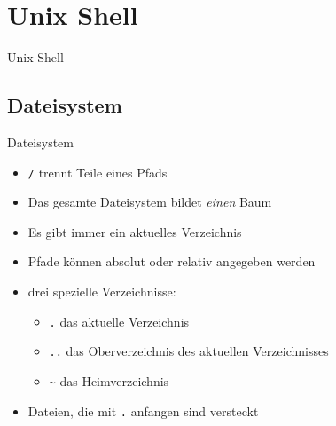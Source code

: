 \section{Unix Shell}
  \begin{frame}{Unix Shell}
    \tableofcontents[sectionstyle=show/hide,
                     hideothersubsections]
  \end{frame}

  \subsection{Dateisystem}
    \begin{frame}{Dateisystem}
      \begin{itemize}
        \item \texttt{/} trennt Teile eines Pfads
        \item Das gesamte Dateisystem bildet \emph{einen} Baum
        \item Es gibt immer ein aktuelles Verzeichnis
        \item Pfade können absolut oder relativ angegeben werden
        \item drei spezielle Verzeichnisse:
          \begin{itemize}
            \item \texttt{.} das aktuelle Verzeichnis
            \item \texttt{..} das Oberverzeichnis des aktuellen Verzeichnisses
            \item \texttt{\textasciitilde} das Heimverzeichnis
          \end{itemize}
        \item Dateien, die mit \texttt{.} anfangen sind versteckt
      \end{itemize}
    \end{frame}

